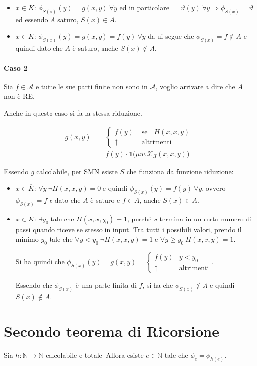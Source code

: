\begin{itemize}
	\item $x \in \overline{K}$: $\phi_{S(x)}(y) = g(x,y) \:\forall y$ ed in particolare $ =  \vartheta(y) \: \forall y \Rightarrow \phi_{S(x)} = \vartheta$ ed essendo $A$ saturo, $S(x) \in A$.
	\item $x \in K$: $\phi_{S(x)}(y) = g(x,y) = f(y)\:\forall y$ da ui segue che $\phi_{S(x)} = f \notin A$ e quindi dato che $A$ è saturo, anche $S(x) \notin A$.
\end{itemize}

\paragraph{Caso 2}

Sia $f \in \mathcal{A}$ e tutte le sue parti finite non sono in $\mathcal{A}$, voglio arrivare a dire che $A$ non è RE.

Anche in questo caso si fa la stessa riduzione.

\begin{align*}
g(x,y) &= \begin{cases}
f(y) &\text{ se } \neg H(x,x,y) \\
\uparrow & \text{ altrimenti}
\end{cases} \\
&= f(y) \cdot \mathbb{1} \big( \mu w . \mathcal{X}_H (x,x,y) \big)
\end{align*}

Essendo \textit{g} calcolabile, per SMN esiste $S$ che funziona da funzione riduzione:

\begin{itemize}
	\item $x \in \overline{K}$: $\forall y \: \neg H(x,x,y) = 0$ e quindi $\phi_{S(x)}(y) = f(y) \: \forall y$, ovvero $\phi_{S(x)} = f$ e dato che $A$ è saturo e $f \in A$, anche $S(x) \in A$.
	\item $x \in K$: $\exists y_0$ tale che $H(x,x,y_0) = 1$, perché $x$ termina in un certo numero di passi quando riceve se stesso in input. Tra tutti i possibili valori, prendo il minimo $y_0$ tale che $\forall y < y_0 \: \neg H(x,x,y) = 1$ e $\forall y \geq y_0 \: H(x,x,y) = 1 $.
	
	Si ha quindi che $\phi_{S(x)} (y) = g(x,y) = \begin{cases}
	f(y) &y < y_0 \\ 
	\uparrow &\text{altrimenti}
	\end{cases} $.
	
	Essendo che $\phi_{S(x)}$ è una parte finita di $f$, si ha che $\phi_{S(x)} \notin A$ e quindi $S(x) \notin A$. 
\end{itemize}

\section{Secondo teorema di Ricorsione}

Sia $h : \mathbb{N} \rightarrow \mathbb{N}$ calcolabile e totale. Allora esiste $e \in \mathbb{N}$ tale che $\phi_e = \phi_{h(e)}$. 